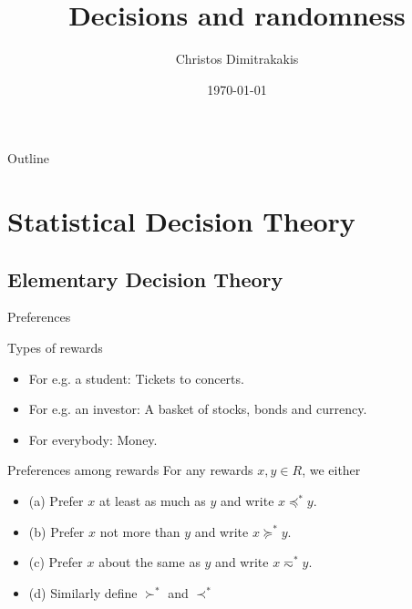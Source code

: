 \documentclass[smaller]{beamer}
\author{Christos Dimitrakakis}
\date{\today}
\title{Decisions and randomness}
\begin{document}
\maketitle
\begin{frame}{Outline}
\tableofcontents
\end{frame}


\section{Statistical Decision Theory}
\label{sec:orgcfa13ed}
\subsection{Elementary Decision Theory}
\label{sec:org12e8694}
\begin{frame}[label={sec:org680ca91}]{Preferences}
\begin{block}{Types of rewards}
\begin{itemize}
\item For e.g. a student: Tickets to concerts.
\item For e.g. an investor: A basket of stocks, bonds and currency.
\item For everybody: Money.
\end{itemize}
\end{block}

\begin{block}{Preferences among rewards}
For any rewards \(x, y \in R\), we either
\begin{itemize}
\item (a) Prefer \(x\) at least as much as \(y\) and write \(x \preceq^* y\).
\item (b) Prefer \(x\) not more than \(y\) and write \(x \succeq^* y\).
\item (c) Prefer \(x\) about the same as \(y\) and write \(x \eqsim^* y\).
\item (d) Similarly define \(\succ^*\) and \(\prec^*\)
\end{itemize}
\end{block}
\end{frame}
\end{document}
